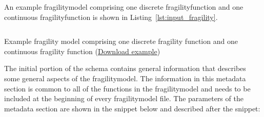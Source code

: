 An example \gls{fragilitymodel} comprising one discrete
\gls{fragilityfunction} and one continuous \gls{fragilityfunction} is shown in
Listing~\ref{lst:input_fragility}.

\begin{listing}[htbp]
  \inputminted[firstline=1,firstnumber=1,fontsize=\footnotesize,frame=single,linenos,bgcolor=lightgray]{xml}{oqum/risk/verbatim/input_fragility.xml}
  \caption{Example fragility model comprising one discrete fragility function and one continuous fragility function (\href{https://raw.githubusercontent.com/gem/oq-engine/master/doc/manual/oqum/risk/verbatim/input_fragility.xml}{Download example})}
  \label{lst:input_fragility}
\end{listing}


The initial portion of the schema contains general information that describes
some general aspects of the \gls{fragilitymodel}. The information in this
metadata section is common to all of the functions in the \gls{fragilitymodel}
and needs to be included at the beginning of every \gls{fragilitymodel} file.
The parameters of the metadata section are shown in the snippet below and
described after the snippet:

\inputminted[firstline=4,firstnumber=4,lastline=9,fontsize=\footnotesize,frame=single,linenos,bgcolor=lightgray]{xml}{oqum/risk/verbatim/input_fragility.xml}

